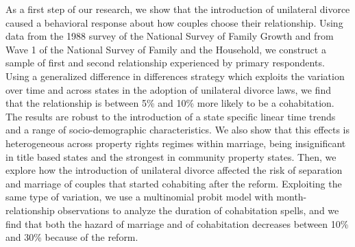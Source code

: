 \documentclass[12pt]{article}
\numberwithin{table}{section}
\begin{document}
As a first step of our research, we show that the introduction of unilateral divorce caused a behavioral response about how couples choose their relationship. Using data from the 1988 survey of the National Survey of Family Growth and from Wave 1 of the National Survey of Family and the Household, we construct a sample of first and second relationship experienced by primary respondents. Using a generalized difference in differences strategy which exploits the variation over time and across states in the adoption of unilateral divorce laws, we find that the relationship is between 5\% and 10\% more likely to be a cohabitation. The results are robust to the introduction of a state specific linear time trends and a range of socio-demographic characteristics. We also show that this effects is heterogeneous across property rights regimes within marriage, being insignificant in title based states and the strongest in community property states. Then, we explore how the introduction of unilateral divorce affected the risk of separation and marriage of couples that started cohabiting after the reform. Exploiting the same type of variation, we use  a multinomial probit model with month-relationship observations to analyze the duration of cohabitation spells, and we find that both the hazard of marriage and of cohabitation decreases between 10\% and 30\% because of the reform.\\
\end{document}
